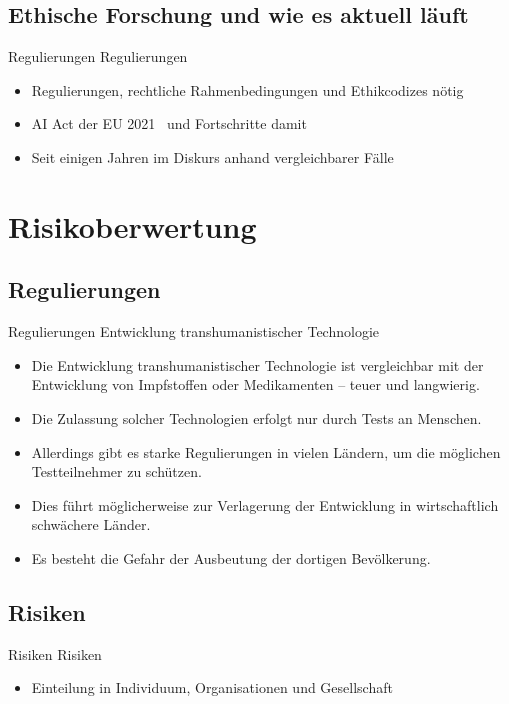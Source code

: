 \documentclass[aspectratio=169,16pt,xcolor=table]{beamer}
\begin{document}
\subsection{Ethische Forschung und wie es aktuell läuft}
\begin{frame}{Regulierungen}
Regulierungen
	\begin{itemize}
		\item{Regulierungen, rechtliche Rahmenbedingungen und Ethikcodizes nötig}
		\item{AI Act der EU 2021~\cite{ai_act_eu_2021} und Fortschritte damit~\cite{ai_act_deal_2023}}
		\item{Seit einigen Jahren im Diskurs anhand vergleichbarer Fälle~\cite{lee2016cochlear}}
	\end{itemize}
\end{frame}

\section{Risikoberwertung}
\subsection{Regulierungen}
\begin{frame}{Regulierungen}
  Entwicklung transhumanistischer Technologie
  \begin{itemize}
    \item Die Entwicklung transhumanistischer Technologie ist vergleichbar mit der Entwicklung von Impfstoffen oder Medikamenten – teuer und langwierig.
    \item Die Zulassung solcher Technologien erfolgt nur durch Tests an Menschen.
    \item Allerdings gibt es starke Regulierungen in vielen Ländern, um die möglichen Testteilnehmer zu schützen.
    \item Dies führt möglicherweise zur Verlagerung der Entwicklung in wirtschaftlich schwächere Länder.
    \item Es besteht die Gefahr der Ausbeutung der dortigen Bevölkerung.
  \end{itemize}
\end{frame}

\subsection{Risiken}
\begin{frame}{Risiken}
Risiken
	\begin{itemize}
		\item{Einteilung in Individuum, Organisationen und Gesellschaft}
	\end{itemize}
\end{frame}
\end{document}
